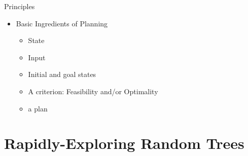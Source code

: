 \documentclass[%
  professionalfonts,%
  xcolor={%
    usenames,%
    dvipsnames,%
    svgnames,%
    table,%
    hyperref%
  }%
]{beamer}
\begin{document}
      \begin{frame}{Principles}
        \begin{itemize}
          \item Basic Ingredients of Planning
          \begin{itemize}
            \item State
            \item Input
            \item Initial and goal states
            \item A criterion: Feasibility and/or Optimality
            \item a plan
          \end{itemize}
        \end{itemize}
      \end{frame}
    
    \section{Rapidly-Exploring Random Trees}
      \begin{frame}
        \huge{}
      \end{frame}
      
\end{document}
